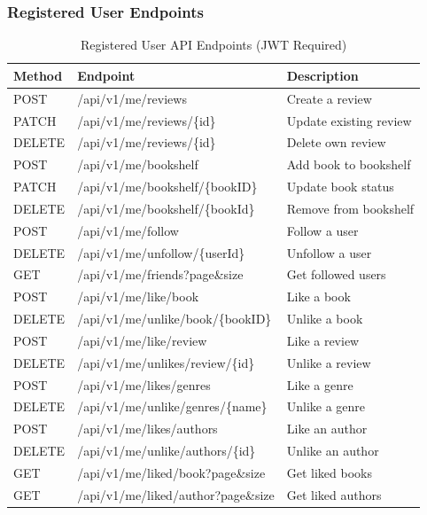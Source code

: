 \subsubsection{Registered User Endpoints}
\begin{table}[H]
    \centering
    \caption{Registered User API Endpoints (JWT Required)}
    \label{tab:user_endpoints}
    \begin{tabular}{@{}p{}p{}p{}@{}}
        \toprule
        \textbf{Method} & \textbf{Endpoint} & \textbf{Description} \\ \midrule
        POST & /api/v1/me/reviews & Create a review \\
        PATCH & /api/v1/me/reviews/\{id\} & Update existing review \\
        DELETE & /api/v1/me/reviews/\{id\} & Delete own review \\
        POST & /api/v1/me/bookshelf & Add book to bookshelf \\
        PATCH & /api/v1/me/bookshelf/\{bookID\} & Update book status \\
        DELETE & /api/v1/me/bookshelf/\{bookId\} & Remove from bookshelf \\
        POST & /api/v1/me/follow & Follow a user \\
        DELETE & /api/v1/me/unfollow/\{userId\} & Unfollow a user \\
        GET & /api/v1/me/friends?page\&size & Get followed users \\
        POST & /api/v1/me/like/book & Like a book \\
        DELETE & /api/v1/me/unlike/book/\{bookID\} & Unlike a book \\
        POST & /api/v1/me/like/review & Like a review \\
        DELETE & /api/v1/me/unlikes/review/\{id\} & Unlike a review \\
        POST & /api/v1/me/likes/genres & Like a genre \\
        DELETE & /api/v1/me/unlike/genres/\{name\} & Unlike a genre \\
        POST & /api/v1/me/likes/authors & Like an author \\
        DELETE & /api/v1/me/unlike/authors/\{id\} & Unlike an author \\
        GET & /api/v1/me/liked/book?page\&size & Get liked books \\
        GET & /api/v1/me/liked/author?page\&size & Get liked authors \\

\end{tabular}
\end{table}
